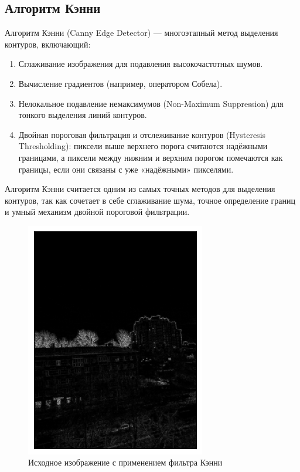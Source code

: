 \documentclass[a4paper,12pt]{article}
\begin{document}
\subsection{Алгоритм Кэнни}
Алгоритм Кэнни (Canny Edge Detector) --- многоэтапный метод выделения контуров, включающий:
\begin{enumerate}
    \item Сглаживание изображения для подавления высокочастотных шумов.
    \item Вычисление градиентов (например, оператором Собела).
    \item Нелокальное подавление немаксимумов (Non-Maximum Suppression) для тонкого выделения линий контуров.
    \item Двойная пороговая фильтрация и отслеживание контуров (Hysteresis Thresholding): пиксели выше верхнего порога считаются надёжными границами, а пиксели между нижним и верхним порогом помечаются как границы, если они связаны с уже «надёжными» пикселями.
\end{enumerate}
Алгоритм Кэнни считается одним из самых точных методов для выделения контуров, так как сочетает в себе сглаживание шума, точное определение границ и умный механизм двойной пороговой фильтрации.
\begin{figure}[H]
    \centering \includegraphics[width=0.7\textwidth]{results/hpf_4.png}
    \caption{Исходное изображение с применением фильтра Кэнни}
\end{figure}
\end{document}
